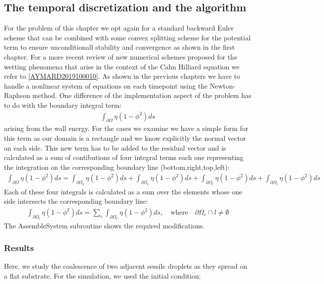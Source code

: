 \documentclass{article}
\begin{document}
\subsection{The temporal discretization and the algorithm}
For the problem of this chapter we opt again for a standard backward Euler scheme that can be combined with some convex splitting scheme for the potential term to ensure unconditionall stability and convergence as shown in the first chapter. For a more recent review of new numerical schemes proposed for the wetting phenomena that arise in the context of the Cahn Hilliard equation we refer to \ref{AYMARD2019100010}. As shown in the previous chapters we have to handle a nonlinear system of equations on each timepoint using the Newton-Raphson method. One difference of the implementation aspect of the problem has to do with the boundary integral term:
\begin{align}
\int_{\partial\Omega}\eta(1-\phi^2)ds
\end{align}
 arising from the wall energy. For the cases we examine we have a simple form for this term as our domain is a rectangle and we know explicitly the normal vector on each side. This new term has to be added to the residual vector and is calculated as a sum of contibutions of four integral terms each one representing the integration on the corresponding boundary line (bottom,right,top,left):
 \begin{align}
\int_{\partial\Omega}\eta(1-\phi^2)ds = \int_{\partial\Omega_{b}}\eta(1-\phi^2)ds + \int_{\partial\Omega_{r}}\eta(1-\phi^2)ds + \int_{\partial\Omega_{t}}\eta(1-\phi^2)ds +\int_{\partial\Omega_{l}}\eta(1-\phi^2)ds
\end{align}
  Each of these four integrals is calculated as a sum over the elements whose one side intersects the corresponding boundary line:
\begin{align}
\int_{\partial\Omega_{l}}\eta(1-\phi^2)ds = \sum_{e}\int_{\partial\Omega_{e}}\eta(1-\phi^2)ds,\quad \text{where}\quad {\partial\Omega_{e}}\cap l \neq \emptyset
\end{align}
   The AssembleSystem subroutine shows the required modifications.
   
\subsubsection{Results}
Here, we study the coalescence of two adjacent sessile droplets as they spread on a flat substrate. For the simulation, we used the initial condition:
\end{document}
